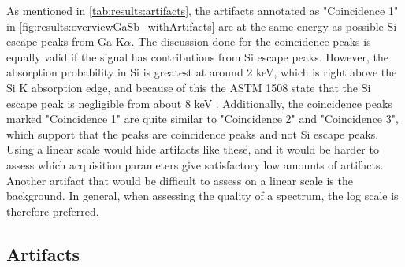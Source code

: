 As mentioned in \cref{tab:results:artifacts}, the artifacts annotated as "Coincidence 1" in \cref{fig:results:overviewGaSb_withArtifacts} are at the same energy as possible Si escape peaks from Ga K$\alpha$.
The discussion done for the coincidence peaks is equally valid if the signal has contributions from Si escape peaks.
However, the absorption probability in Si is greatest at around 2 keV, which is right above the Si K absorption edge, and because of this the ASTM 1508 state that the Si escape peak is negligible from about 8 keV \cite[8.3.2]{astm_e1508_eds_quantification}.
Additionally, the coincidence peaks marked "Coincidence 1" are quite similar to "Coincidence 2" and "Coincidence 3", which support that the peaks are coincidence peaks and not Si escape peaks.
Using a linear scale would hide artifacts like these, and it would be harder to assess which acquisition parameters give satisfactory low amounts of artifacts.
Another artifact that would be difficult to assess on a linear scale is the background.
In general, when assessing the quality of a spectrum, the log scale is therefore preferred.



\subsection{Artifacts}
\label{discussion:artifacts}

